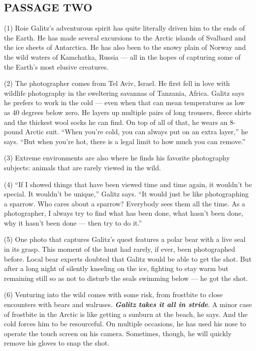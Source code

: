 \documentclass[UTF8,11pt]{ctexart}
\begin{document}
\subsection*{\textbf{PASSAGE TWO}}


(1) Roie Galitz’s adventurous spirit has quite literally driven him to the ends of the Earth. He has made several excursions to the Arctic islands of Svalbard and the ice sheets of Antarctica. He has also been to the snowy plain of Norway and the wild waters of Kamchatka, Russia — all in the hopes of capturing some of the Earth’s most elusive creatures.


(2) The photographer comes from Tel Aviv, Israel. He first fell in love with wildlife photography in the sweltering savannas of Tanzania, Africa. Galitz says he prefers to work in the cold — even when that can mean temperatures as low as 40 degrees below zero. He layers up multiple pairs of long trousers, fleece shirts and the thickest wool socks he can find. On top of all of that, he wears an 8-pound Arctic suit. “When you’re cold, you can always put on an extra layer,” he says. “But when you’re hot, there is a legal limit to how much you can remove.”


(3) Extreme environments are also where he finds his favorite photography subjects: animals that are rarely viewed in the wild.


(4) “If I showed things that have been viewed time and time again, it wouldn’t be special. It wouldn’t be unique,” Galitz says. “It would just be like photographing a sparrow. Who cares about a sparrow? Everybody sees them all the time. As a photographer, I always try to find what has been done, what hasn’t been done, why it hasn’t been done — then try to do it.”


(5) One photo that captures Galitz’s quest features a polar bear with a live seal in its grasp. This moment of the hunt had rarely, if ever, been photographed before. Local bear experts doubted that Galitz would be able to get the shot. But after a long night of silently kneeling on the ice, fighting to stay warm but remaining still so as not to disturb the seals swimming below — he got the shot.


(6) Venturing into the wild comes with some risk, from frostbite to close encounters with bears and walruses. \textbf{\textit{Galitz takes it all in stride}}. A minor case of frostbite in the Arctic is like getting a sunburn at the beach, he says. And the cold forces him to be resourceful. On multiple occasions, he has used his nose to operate the touch screen on his camera. Sometimes, though, he will quickly remove his gloves to snap the shot.
\end{document}
